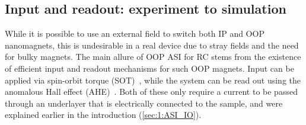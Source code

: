 \subsection{Input and readout: experiment to simulation} \label{sec:3:IO_exp_to_sim}
While it is possible to use an external field to switch both IP and OOP nanomagnets, this is undesirable in a real device due to stray fields and the need for bulky magnets.
The main allure of OOP ASI for RC stems from the existence of efficient input and readout mechanisms for such OOP magnets.
Input can be applied via spin-orbit torque (SOT)~\cite{SOT_FM_AFM,SOTswitchingCoPt}, while the system can be read out using the anomalous Hall effect (AHE)~\cite{AHE}.
Both of these only require a current to be passed through an underlayer that is electrically connected to the sample, and were explained earlier in the introduction (\cref{sec:1:ASI_IO}).

